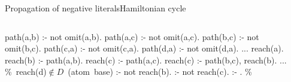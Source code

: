 \begin{frame}{Propagation of negative literals}{Hamiltonian cycle}
  \medskip
  \begin{columns}
    \begin{column}{0.45\textwidth}
    \begin{minipage}{.4\textwidth}\small
      \begin{semiverbatim}
path(a,b) :- not omit(a,b).
path(a,c) :- not omit(a,c).
path(b,c) :- not omit(b,c).
path(c,a) :- not omit(c,a).
path(d,a) :- not omit(d,a).
...
\alert{reach(a)}.
\alert{reach(b)} :- path(a,b).
\alert{reach(c)} :- path(a,c).
\alert{reach(c)} :- path(b,c), reach(b).
...
\mbox{{\color{comment}\% reach(d)\({}\not\in{}D\) (atom base)}}
:- not reach(b).
:- not reach(c).
:- . \color{comment}\% 
      \end{semiverbatim}
    \end{minipage}
    \end{column}
    \begin{column}[t]{0.45\textwidth}
      \centering
      \Graph[draw=none]
    \end{column}
  \end{columns}
\end{frame}
